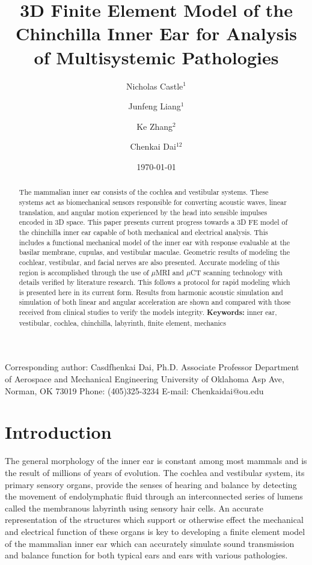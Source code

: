 \documentclass[12pt]{article}
\title{\textbf{3D Finite Element Model of the Chinchilla Inner Ear for Analysis of Multisystemic Pathologies}}
\author{Nicholas Castle$^1$ \and Junfeng Liang$^1$\and Ke Zhang$^2$\and Chenkai Dai$^{12}$}
\institute{$^1$School of Aerospace and Mechanical Engineering \\ $^2$Stephenson School of Biomedical Engineering \\ University of Oklahoma, Norman OK 73019}
\date{\today}
\begin{document}
\maketitle

\noindent Corresponding author: \newline
Casdfhenkai Dai, Ph.D. \newline
Associate Professor \newline
Department of Aerospace and Mechanical Engineering \newline
University of Oklahoma  Asp Ave, \newline
Norman, OK 73019 \newline
Phone: (405)325-3234 \newline
E-mail: Chenkaidai@ou.edu \newline


\begin{abstract}
The mammalian inner ear consists of the cochlea and vestibular systems. These systems act as biomechanical sensors responsible for converting acoustic waves, linear translation, and angular motion experienced by the head into sensible impulses encoded in 3D space. This paper presents current progress towards a 3D FE model of the chinchilla inner ear capable of both mechanical and electrical analysis. This includes a functional mechanical model of the inner ear with response evaluable at the basilar membrane, cupulas, and vestibular maculae. Geometric results of modeling the cochlear, vestibular, and facial nerves are also presented. Accurate modeling of this region is accomplished through the use of $\mu$MRI and $\mu$CT scanning technology with details verified by literature research. This follows a protocol for rapid modeling which is presented here in its current form. Results from harmonic acoustic simulation and simulation of both linear and angular acceleration are shown and compared with those received from clinical studies to verify the models integrity. \newline \newline \textbf{Keywords:} inner ear, vestibular, cochlea, chinchilla, labyrinth, finite element, mechanics
\end{abstract}


\section{Introduction}
The general morphology of the inner ear is constant among most mammals and is the result of millions of years of evolution. \cite{ekdale:chinchanat} The cochlea and vestibular system, its primary sensory organs, provide the senses of hearing and balance by detecting the movement of endolymphatic fluid through an interconnected series of lumens called the membranous labyrinth using sensory hair cells. An accurate representation of the structures which support or otherwise effect the mechanical and electrical function of these organs is key to developing a finite element model of the mammalian inner ear which can accurately simulate sound transmission and balance function for both typical ears and ears with various pathologies. 
\end{document}

